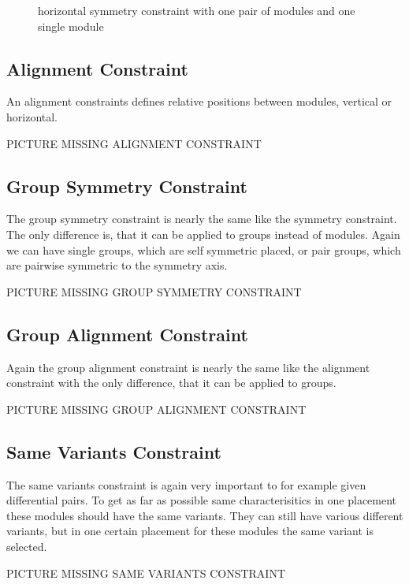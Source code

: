 \begin{figure}
	\centering
	
	\caption{horizontal symmetry constraint with one pair of modules and one single module}
	\label{fig:constraint_symmetry}
\end{figure}


\subsection{Alignment Constraint}
An alignment constraints defines relative positions between modules, vertical or horizontal.

PICTURE MISSING ALIGNMENT CONSTRAINT

\subsection{Group Symmetry Constraint}
The group symmetry constraint is nearly the same like the symmetry constraint. The only difference is, that it can be applied to groups instead of modules. Again we can have single groups, which are self symmetric placed, or pair groups, which are pairwise symmetric to the symmetry axis.

PICTURE MISSING GROUP SYMMETRY CONSTRAINT

\subsection{Group Alignment Constraint}
Again the group alignment constraint is nearly the same like the alignment constraint with the only difference, that it can be applied to groups.

PICTURE MISSING GROUP ALIGNMENT CONSTRAINT

\subsection{Same Variants Constraint}
The same variants constraint is again very important to for example given differential pairs. To get as far as possible same characterisitics in one placement these modules should have the same variants. They can still have various different variants, but in one certain placement for these modules the same variant is selected.

PICTURE MISSING SAME VARIANTS CONSTRAINT

